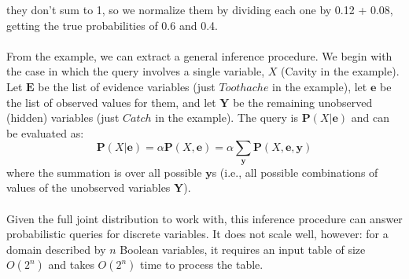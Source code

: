 they don’t sum to 1, so we normalize them by dividing each one by 0.12 + 0.08, getting the true probabilities of 0.6 and 0.4.\\\\
From the example, we can extract a general inference procedure. We begin with the case in which the query involves a single variable, $X$ (Cavity in the example).  Let $\textbf{E}$ be the list of evidence variables (just $Toothache$ in the example), let $\textbf{e}$ be the list of observed values for them,  and let $\textbf{Y}$ be the remaining unobserved (hidden) variables (just $Catch$ in the example). The query is $\textbf{P}(X | \textbf{e})$ and can be evaluated as:
\[\textbf{P}(X | \textbf{e}) = \alpha \textbf{P}(X, \textbf{e}) = \alpha \sum_{\textbf{y}}\textbf{P}(X, \textbf{e}, \textbf{y})\]
where the summation is over all possible $\textbf{y}$s (i.e., all possible combinations of values of the unobserved variables $\textbf{Y}$).\\\\
Given the full joint distribution to work with, this inference procedure can answer probabilistic
queries for discrete variables. It does not scale well, however: for a domain described by $n$ Boolean variables, it requires an input table of size $O(2^n)$ and takes $O(2^n)$ time to process the table.

